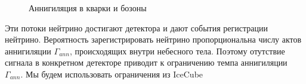 \begin{figure}[!h]
	\centering
	\begin{subfigure}[b!]{0.3\textwidth}
	\end{subfigure}
	\begin{subfigure}[b!]{0.2\textwidth}
	\end{subfigure}
	\caption {Аннигиляция в кварки и бозоны}
	\label{pic:ann_channels}
\end{figure}

Эти потоки нейтрино достигают детектора и дают события регистрации нейтрино. Вероятность зарегистрировать нейтрино пропорциональна числу актов аннигиляции $\Gamma_{ann}$, происходящих внутри небесного тела. Поэтому отутствие сигнала в конкретном детекторе приводит к ограничению темпа аннигиляции $\Gamma_{ann}$. 
Мы будем использовать ограничения из IceCube \cite{Aartsen_2017}


